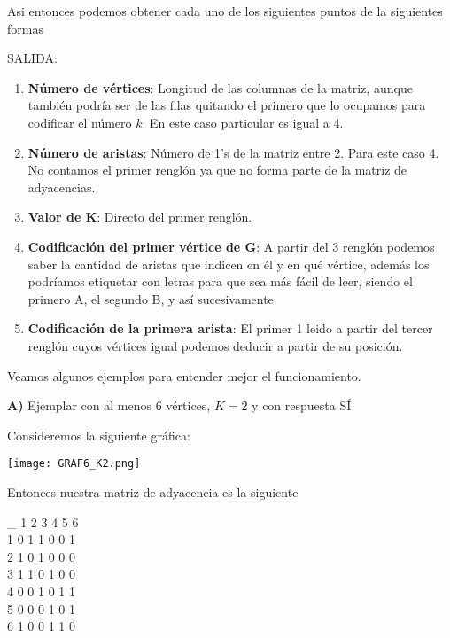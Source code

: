 \documentclass[12pt,letterpaper]{article}
\begin{document}
Asi entonces podemos obtener cada uno de los siguientes puntos de la siguientes formas

SALIDA:
\begin{enumerate}
    \item \textbf{Número de vértices}: Longitud de las columnas de la matriz, aunque también podría ser de las filas quitando el primero que lo ocupamos para codificar el número $k$. En este caso particular es igual a 4.%
    
    \item \textbf{Número de aristas}: Número de 1's de la matriz entre 2. Para este caso 4. No contamos el primer renglón ya que no forma parte de la matriz de adyacencias.
    
    \item \textbf{Valor de K}: Directo del primer renglón.
    
    \item \textbf{Codificación del primer vértice de G}: A partir del 3 renglón podemos saber la cantidad de aristas que indicen en él y en qué vértice, además los podríamos etiquetar con letras para que sea más fácil de leer, siendo el primero A, el segundo B, y así sucesivamente.%
    
    \item \textbf{Codificación de la primera arista}: El primer 1 leido a partir del tercer renglón cuyos vértices igual podemos deducir a partir de su posición. %
\end{enumerate}

Veamos algunos ejemplos para entender mejor el funcionamiento.

\textbf{A)} Ejemplar con al menos 6 vértices, $K = 2$ y con respuesta SÍ

Consideremos la siguiente gráfica:

\begin{center}
    \texttt{[image: GRAF6\_K2.png]}
\end{center}

Entonces nuestra matriz de adyacencia es la siguiente

\begin{center}
\_ 1 2 3 4 5 6\\
1  0 1 1 0 0 1\\
2  1 0 1 0 0 0\\
3  1 1 0 1 0 0\\
4  0 0 1 0 1 1\\
5  0 0 0 1 0 1\\
6  1 0 0 1 1 0\\
\end{center}
\end{document}
